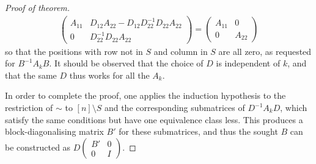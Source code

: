 \documentclass[12pt]{article}
\begin{document}
\begin{proof}[Proof of theorem]
\begin{multline*}
    \begin{pmatrix} 
      A_{11}& D_{12}A_{22} -D_{12}D_{22}^{-1}D_{22}A_{22} \\
      0& D_{22}^{-1} D_{22} A_{22}
    \end{pmatrix} =
    \begin{pmatrix} 
      A_{11}& 0 \\
      0& A_{22}
    \end{pmatrix}
  \end{multline*}
  so that the positions with row not in $S$ and column in $S$ are all 
  zero, as requested for $B^{-1}A_kB$. It should be observed that the 
  choice of $D$ is independent of $k$, and that the same $D$ thus 
  works for all the $A_k$.
  
  In order to complete the proof, one applies the induction hypothesis 
  to the restriction of $\sim$ to $[n] \setminus S$ and the 
  corresponding submatrices of $D^{-1} A_k D$, which satisfy the same 
  conditions but have one equivalence class less. This produces a 
  block-diagonalising matrix $B'$ for these submatrices, and thus the 
  sought $B$ can be constructed as \(D \left( \begin{smallmatrix} 
  B'&0 \\ 0&I \end{smallmatrix} \right)\).
\end{proof}
\end{document}
